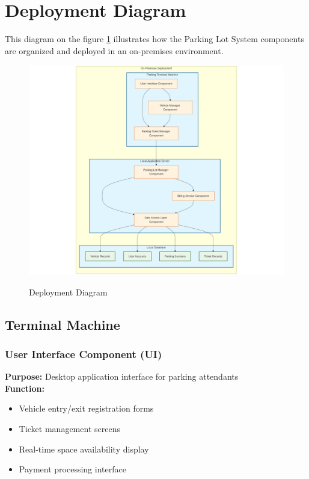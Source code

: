 \section{Deployment Diagram}

This diagram on the figure \ref{Deployment-Diagram} illustrates how the Parking Lot System components are organized and deployed in an on-premises environment.

\begin{figure}[h!]
    \centering
    \includegraphics[width=\textwidth]{deployment-diagram/Deploy.png}
    \label{Deployment-Diagram}
    \caption{Deployment Diagram}
\end{figure}

\subsection{Terminal Machine}
    \subsubsection{User Interface Component (UI)}
        \textbf{Purpose:} Desktop application interface for parking attendants\\
        \textbf{Function:}
        \begin{itemize}
            \item Vehicle entry/exit registration forms
            \item Ticket management screens
            \item Real-time space availability display
            \item Payment processing interface
        \end{itemize}

